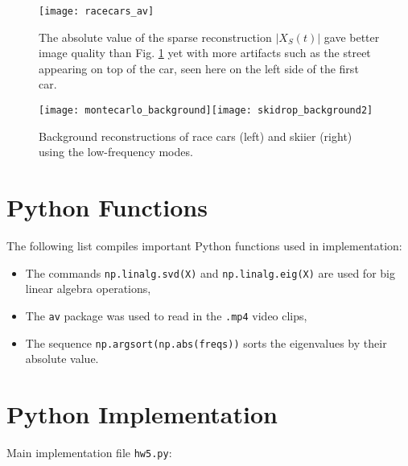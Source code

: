 \documentclass{article}
\begin{document}
\begin{figure}[b!]
  \centering
  \texttt{[image: racecars\_av]}
  \caption{The absolute value of the sparse reconstruction $|X_S(t)|$ gave better image quality than Fig. \ref{montecarlo2} yet with more artifacts such as the street appearing on top of the car, seen here on the left side of the first car.}\label{montecarlo2}
\end{figure}




\begin{figure}[t!]
  \centering
  \texttt{[image: montecarlo\_background]}\quad\texttt{[image: skidrop\_background2]}
  \caption{Background reconstructions of race cars (left) and skiier (right) using the low-frequency modes.}\label{backgrounds}
\end{figure}

\begin{appendices}

\section{Python Functions}\label{functions}
The following list compiles important Python functions used in implementation:
\begin{itemize}
\item The commands \texttt{np.linalg.svd(X)} and \texttt{np.linalg.eig(X)} are used for big linear algebra operations,
\item The \texttt{av} package was used to read in the \texttt{.mp4} video clips,
\item The sequence \texttt{np.argsort(np.abs(freqs))} sorts the eigenvalues by their absolute value.
\end{itemize}

\section{Python Implementation}\label{implementation}
% 
Main implementation file \texttt{hw5.py}:


\end{appendices}
\end{document}
